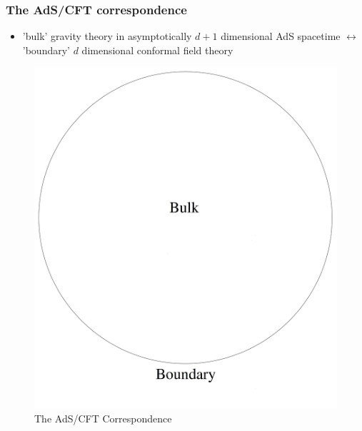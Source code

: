 \documentclass[10pt,aspectratio=169]{beamer}
\begin{document}
\begin{frame}
\frametitle{The AdS/CFT correspondence}

\begin{minipage}[t]{0.48\linewidth}

\begin{itemize}

\item 'bulk' gravity theory in asymptotically $d+1$ dimensional AdS spacetime $\leftrightarrow$ 'boundary' $d$ dimensional conformal field theory

\end{itemize}

\end{minipage}
%
\hfill
%
\begin{minipage}[t]{0.48\linewidth}

\begin{figure}
    \begin{center}
    
        \includegraphics[scale=0.06]{adscft}    
    
    \end{center}
    \caption{The AdS/CFT Correspondence}
    \label{fig:WDW}
\end{figure}

\end{minipage}

\end{frame}
\end{document}
